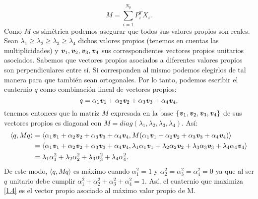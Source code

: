 		\begin{equation}\label{MSum}
			M = \sum_{i = 1}^{N_p}P_i^TX_i.
		\end{equation}
 Como $ M $ es simétrica podemos asegurar que todos sus valores propios son reales. Sean $ \lambda_1 \geq \lambda_2 \geq \lambda_3 \geq \lambda_4 $ dichos valores propios (tenemos en cuentas las multiplicidades) y $ \textbf{\emph{v}}_1, \textbf{\emph{v}}_2, \textbf{\emph{v}}_3, \textbf{\emph{v}}_4 $ sus correspondientes vectores propios unitarios asociados. Sabemos que vectores propios asociados a diferentes valores propios son perpendiculares entre sí. Si corresponden al mismo podemos elegirlos de tal manera para que también sean ortogonales.  Por lo tanto, podemos escribir el cuaternio $ q $ como combinación lineal de vectores propios:
		\[
		q = \alpha_1 \textbf{\emph{v}}_1 + \alpha_2 \textbf{\emph{v}}_2 + \alpha_3 \textbf{\emph{v}}_3 + \alpha_4 \textbf{\emph{v}}_4,
		\]
		tenemos entonces que la matriz $ M $ expresada en la base $ \{ \textbf{\emph{v}}_1, \textbf{\emph{v}}_2, \textbf{\emph{v}}_3, \textbf{\emph{v}}_4\} $ de sus vectores propios es diagonal  con $ M = diag(\lambda_1, \lambda_2, \lambda_3, \lambda_4) $. Así:
		\begin{equation*}
		\begin{split}
		\langle q , M q \rangle &= \langle \alpha_1 \textbf{\emph{v}}_1 + \alpha_2 \textbf{\emph{v}}_2 + \alpha_3 \textbf{\emph{v}}_3 + \alpha_4 \textbf{\emph{v}}_4, M(\alpha_1 \textbf{\emph{v}}_1 + \alpha_2 \textbf{\emph{v}}_2 + \alpha_3 \textbf{\emph{v}}_3 + \alpha_4 \textbf{\emph{v}}_4 )\rangle \\
		&=  \langle \alpha_1 \textbf{\emph{v}}_1 + \alpha_2 \textbf{\emph{v}}_2 + \alpha_3 \textbf{\emph{v}}_3 + \alpha_4 \textbf{\emph{v}}_4, \lambda_1\alpha_1 \textbf{\emph{v}}_1 + \lambda_2\alpha_2 \textbf{\emph{v}}_2 + \lambda_3\alpha_3 \textbf{\emph{v}}_3 + \lambda_4\alpha_4 \textbf{\emph{v}}_4 \rangle \\
		&=  \lambda_1\alpha_1^2 + \lambda_2\alpha_2^2 + \lambda_3\alpha_3^2 + \lambda_4\alpha_4^2.
		\end{split}
		\end{equation*}
		De este modo, 
		$ \langle q , M q \rangle $ es máximo cuando $ \alpha_1^2 = 1 $ y $ \alpha_2^2 = \alpha_3^2 = \alpha_4^2 = 0 $ ya que al ser $ q $ unitario debe cumplir $ \alpha_1^2 + \alpha_2^2 + \alpha_3^2 + \alpha_4^2 = 1$. Así, el cuaternio que maximiza \eqref{1.4} es el vector propio asociado al máximo valor propio de M.
		
